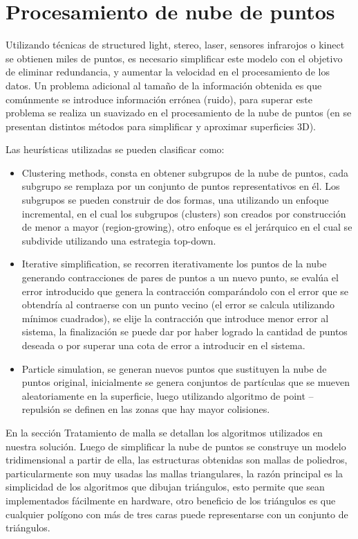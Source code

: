 \section{Procesamiento de nube de puntos}

Utilizando técnicas de structured light, stereo, laser, sensores infrarojos o kinect se obtienen miles de puntos, es necesario simplificar este modelo con el objetivo de eliminar redundancia, y aumentar la velocidad en el procesamiento de los datos. Un problema adicional al tamaño de la información obtenida es que comúnmente se introduce información errónea (ruido), para superar este problema se realiza un suavizado en el procesamiento de la nube de puntos (en \cite{PCloudSimplify} se presentan distintos métodos para simplificar y aproximar superficies 3D).

Las heurísticas utilizadas se pueden clasificar como\cite{PntCloud}:
\begin{itemize}
   \item Clustering methods, consta en obtener subgrupos de la nube de puntos, cada subgrupo se remplaza por un conjunto de puntos representativos en él. Los subgrupos se pueden construir de dos formas, una utilizando un enfoque incremental, en el cual los subgrupos (clusters) son creados por construcción de menor a mayor (region-growing), otro enfoque es el jerárquico en el cual se subdivide utilizando una estrategia top-down.
   \item Iterative simplification, se recorren iterativamente los puntos de la nube generando contracciones de pares de puntos a un nuevo punto, se evalúa el error introducido que genera la contracción comparándolo con el error que se obtendría al contraerse con un punto vecino (el error se calcula utilizando mínimos cuadrados), se elije la contracción que introduce menor error al sistema, la finalización se puede dar por haber logrado la cantidad de puntos deseada o por superar una cota de error a introducir en el sistema.
   \item Particle simulation, se generan nuevos puntos que sustituyen la nube de puntos original, inicialmente se genera conjuntos de partículas que se mueven aleatoriamente en la superficie, luego utilizando algoritmo de point – repulsión se definen en las zonas que hay mayor colisiones.
\end{itemize}

En la sección Tratamiento de malla se detallan los algoritmos utilizados en nuestra solución.
Luego de simplificar la nube de puntos se construye un modelo tridimensional a partir de ella, las estructuras obtenidas son mallas de poliedros, particularmente son muy usadas las mallas triangulares, la razón principal es la simplicidad de los algoritmos que dibujan triángulos, esto permite que sean implementados fácilmente en hardware, otro beneficio de los triángulos es que cualquier polígono con más de tres caras puede representarse con un conjunto de triángulos\cite{PCloudTriangle}.

